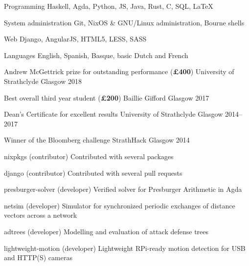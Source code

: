 \documentclass[11pt, a4paper]{awesome-cv}
\begin{document}

\begin{cvskills}
    \cvskill
      {Programming} %
      {Haskell, Agda, Python, JS, Java, Rust, C, SQL, LaTeX} %
  
    \cvskill
      {System administration} %
      {Git, NixOS \& GNU/Linux administration, Bourne shells} %
  
    \cvskill
      {Web} %
      {Django, AngularJS, HTML5, LESS, SASS} %
  
    \cvskill
      {Languages} %
      {English, Spanish, Basque, basic Dutch and French} %
\end{cvskills}


\begin{cvhonors}
  
    \cvhonor
      {Andrew McGettrick prize for outstanding performance (\textbf{£400})} %
      {University of Strathclyde} %
      {Glasgow} %
      {2018} %
  
    \cvhonor
      {Best overall third year student (\textbf{£200})} %
      {Baillie Gifford} %
      {Glasgow} %
      {2017} %
  
    \cvhonor
      {Dean's Certificate for excellent results} %
      {University of Strathclyde} %
      {Glasgow} %
      {2014--2017} %
  
    \cvhonor
      {Winner of the Bloomberg challenge} %
      {StrathHack} %
      {Glasgow} %
      {2014} %
\end{cvhonors}


\begin{cvhonors}
    \cvhonor
        {nixpkgs (contributor)}
        {Contributed with several packages}
        {}
        {}

    \cvhonor
        {django (contributor)}
        {Contributed with several pull requests}
        {}
        {}

    \cvhonor
        {presburger-solver (developer)}
        {Verified solver for Presburger Arithmetic in Agda}
        {}
        {}

    \cvhonor
        {netsim (developer)}
        {Simulator for synchronized periodic exchanges of distance vectors
        across a network}
        {}
        {}

    \cvhonor
        {adtrees (developer)}
        {Modelling and evaluation of attack defense trees}
        {}
        {}

    \cvhonor
        {lightweight-motion (developer)}
        {Lightweight RPi-ready motion detection for USB and HTTP(S) cameras}
        {}
        {}
\end{cvhonors}
\end{document}

